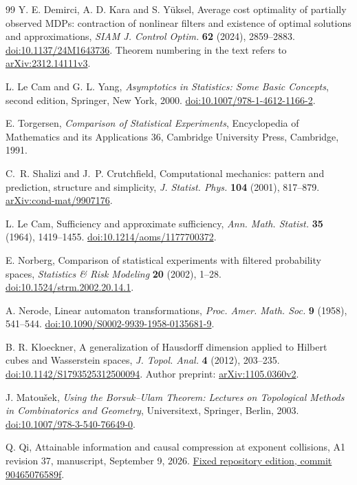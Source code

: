 \begin{thebibliography}{99}
Y. E. Demirci, A. D. Kara and S. Y\"uksel, Average cost optimality of
partially observed MDPs: contraction of nonlinear filters and existence
of optimal solutions and approximations,
\emph{SIAM J. Control Optim.} \textbf{62} (2024), 2859--2883.
\href{https://doi.org/10.1137/24M1643736}{doi:10.1137/24M1643736}.
Theorem numbering in the text refers to
\href{https://arxiv.org/abs/2312.14111v3}{arXiv:2312.14111v3}.

L. Le Cam and G. L. Yang, \emph{Asymptotics in Statistics: Some Basic
Concepts}, second edition, Springer, New York, 2000.
\href{https://doi.org/10.1007/978-1-4612-1166-2}{doi:10.1007/978-1-4612-1166-2}.

E. Torgersen, \emph{Comparison of Statistical Experiments},
Encyclopedia of Mathematics and its Applications 36,
Cambridge University Press, Cambridge, 1991.

C.~R. Shalizi and J.~P. Crutchfield,
Computational mechanics: pattern and prediction, structure and simplicity,
\emph{J. Statist. Phys.} \textbf{104} (2001), 817--879.
\href{https://arxiv.org/abs/cond-mat/9907176}{arXiv:cond-mat/9907176}.


L. Le Cam, Sufficiency and approximate sufficiency,
\emph{Ann. Math. Statist.} \textbf{35} (1964), 1419--1455.
\href{https://doi.org/10.1214/aoms/1177700372}{doi:10.1214/aoms/1177700372}.

E. Norberg, Comparison of statistical experiments with filtered
probability spaces, \emph{Statistics \& Risk Modeling} \textbf{20}
(2002), 1--28.
\href{https://doi.org/10.1524/strm.2002.20.14.1}{doi:10.1524/strm.2002.20.14.1}.

A. Nerode, Linear automaton transformations,
\emph{Proc. Amer. Math. Soc.} \textbf{9} (1958), 541--544.
\href{https://doi.org/10.1090/S0002-9939-1958-0135681-9}{doi:10.1090/S0002-9939-1958-0135681-9}.

B. R. Kloeckner, A generalization of Hausdorff dimension applied to
Hilbert cubes and Wasserstein spaces,
\emph{J. Topol. Anal.} \textbf{4} (2012), 203--235.
\href{https://doi.org/10.1142/S1793525312500094}{doi:10.1142/S1793525312500094}.
Author preprint: \href{https://arxiv.org/abs/1105.0360v2}{arXiv:1105.0360v2}.

J. Matou\v{s}ek, \emph{Using the Borsuk--Ulam Theorem: Lectures on
Topological Methods in Combinatorics and Geometry}, Universitext,
Springer, Berlin, 2003.
\href{https://doi.org/10.1007/978-3-540-76649-0}{doi:10.1007/978-3-540-76649-0}.

Q. Qi, Attainable information and causal compression at exponent
collisions, A1 revision 37, manuscript, September 9, 2026.
\href{https://github.com/TrillionniumFoundation/theta-theory/tree/90465076589f5e5c69227d624f278c47744f1c1d}{Fixed repository edition, commit 90465076589f}.

\end{thebibliography}
